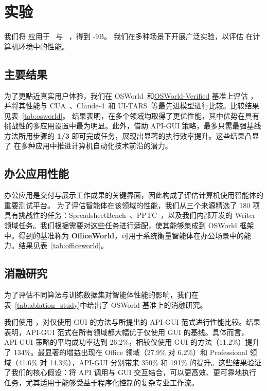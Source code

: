 \section{实验}\label{experiment}
我们将 \computerrl 应用于 \glm~\citep{glm2024chatglm}与 \glmv~\citep{hong2025glm}，得到 \model-9B。
我们在多种场景下开展广泛实验，以评估 \model 在计算机环境中的性能。



\subsection{主要结果}\label{exp:osworld}
为了更贴近真实用户体验，我们在 OSWorld~\citep{xie2024osworld}和\href{https://xlang.ai/blog/osworld-verified}{OSWorld-Verified} 基准上评估 \model，并将其性能与 CUA~\citep{cua2025}、Claude-4~\citep{claude2}和 UI-TARS~\citep{qin2025ui}等最先进模型进行比较。比较结果见表~\ref{tab:osworld}。
结果表明，\model 在多个领域均取得了更优性能，其中优势在具有挑战性的多应用设置中最为明显。此外，借助 API-GUI 策略，\model 最多只需最强基线方法所用步骤的 \textbf{1/3} 即可完成任务，展现出显著的执行效率提升。这些结果凸显了 \computerrl 在多种应用中推进计算机自动化技术前沿的潜力。

\subsection{办公应用性能}
办公应用是交付与展示工作成果的关键界面，因此构成了评估计算机使用智能体的重要测试平台。
为了评估智能体在该领域的性能，我们从三个来源精选了 180 项具有挑战性的任务：SpreadsheetBench~\citep{ma2024spreadsheetbench}、PPTC~\citep{guo2023pptc}，以及我们内部开发的 Writer 领域任务。我们根据需要对这些任务进行适配，使其能够集成到 OSWorld 框架中。得到的基准称为 \textbf{OfficeWorld}，可用于系统衡量智能体在办公场景中的能力。结果见表~\ref{tab:officeworld}。



\subsection{消融研究}
为了评估不同算法与训练数据集对智能体性能的影响，我们在表~\ref{tab:ablation_study}中给出了 OSWorld 基准上的消融研究。



我们使用 \gptfouro，对仅使用 GUI 的方法与所提出的 API-GUI 范式进行性能比较。结果表明，API-GUI 范式在所有领域都大幅优于仅使用 GUI 的基线。具体而言，API-GUI 策略的平均成功率达到 26.2\%，相较仅使用 GUI 的方法（11.2\%）提升了 134\%。最显著的增益出现在 Office 领域（27.9\% 对 6.2\%）和 Professional 领域（41.6\% 对 14.3\%），API-GUI 分别带来 350\% 和 191\% 的提升。这些结果验证了我们的核心假设：将 API 调用与 GUI 交互结合，可以更高效、更可靠地执行任务，尤其适用于能够受益于程序化控制的复杂专业工作流。

